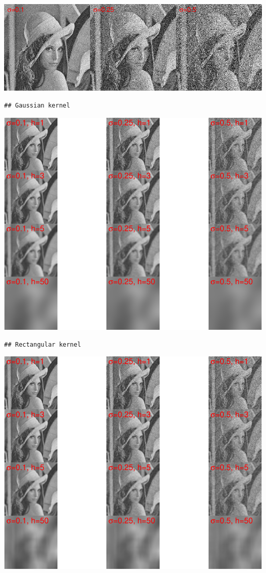 \documentclass[10pt,]{article}
\begin{document}
\includegraphics{project2_files/figure-latex/Nadaraya-Watson-estimator Lena-1.pdf}

\begin{verbatim}
## Gaussian kernel
\end{verbatim}

\includegraphics{project2_files/figure-latex/Nadaraya-Watson-estimator Lena-2.pdf}

\begin{verbatim}
## Rectangular kernel
\end{verbatim}

\includegraphics{project2_files/figure-latex/Nadaraya-Watson-estimator Lena-3.pdf}
\end{document}
